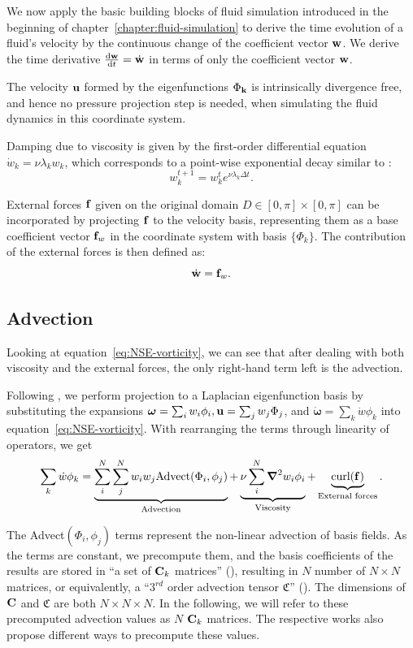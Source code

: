 We now apply the basic building blocks of fluid simulation introduced in the
beginning of chapter~\ref{chapter:fluid-simulation} to derive the time evolution
of a fluid's velocity by the continuous change of the coefficient vector
$\vb{w}$. We derive the time derivative $\dv{\vb{w}}{t} = \dot{\vb{w}}$ in terms of
only the coefficient vector $\vb{w}$.

The velocity $\vb{u}$ formed by the eigenfunctions $\Phi_{\vb{k}}$ is
intrinsically divergence free, and hence no pressure projection step is needed,
when simulating the fluid dynamics in this coordinate system.

Damping due to viscosity is given by the first-order differential equation
$\dot{w}_k = \nu \lambda_k w_k$, which corresponds to a point-wise exponential
decay similar to \cite{StableFluids}: $$w_k^{t+1} = w_k^t e^{\nu \lambda_k
\Delta t}.$$

External forces $\vb{f}$ given on the original domain $D \in [0,\pi]\times [0,
\pi]$ can be incorporated by projecting $\vb{f}$ to the velocity basis,
representing them as a base coefficient vector $\vb{f}_w$ in the coordinate
system with basis $\{\Phi_k\}$. The contribution of the external forces is then
defined as:
$$\dot{\vb{w}} = \vb{f}_w.$$

\subsection*{Advection}
Looking at equation~\eqref{eq:NSE-vorticity}, we can see that after dealing with
both viscosity and the external forces, the only right-hand term left is the
advection.

Following \cite{dewitt}, we perform projection to a Laplacian eigenfunction
basis by substituting the expansions $\boldsymbol{\omega} = \sum_i w_i \phi_i,
\vb{u} = \sum_j w_j\Phi_j$, and $\dot{\boldsymbol{\omega}}
= \sum_k\dot{w}\phi_k$ into equation~\eqref{eq:NSE-vorticity}. With rearranging
the terms through linearity of operators, we get
\begin{equation}
    \sum_k\dot{w}\phi_k
    = \underbrace{\sum_i^N \sum_j^N w_i w_j \text{Advect}(\Phi_i, \phi_j)}_{
        \text{Advection}
    }
    + \underbrace{\nu \sum_i^N \grad^2 w_i \phi_i}_{\text{Viscosity}}
    + \underbrace{\text{curl}(\vb{f})}_{\text{External forces}}.
\end{equation}

The Advect$(\Phi_i, \phi_j)$ terms represent the non-linear advection of basis
fields. As the terms are constant, we precompute them, and the basis coefficients
of the results are stored in ``a set of $\vb{C}_k$ matrices'' (\cite{dewitt}),
resulting in $N$ number of $N \times N$ matrices, or equivalently, a ``$3^{rd}$
order advection tensor $\mathfrak{C}$'' (\cite{scalable-eigenfluids}).  The
dimensions of $\vb{C}$ and $\mathfrak{C}$ are both $N \times N \times N$. In the
following, we will refer to these precomputed advection values as $N$ $\vb{C}_k$
matrices.  The respective works also propose different ways to precompute these
values.

